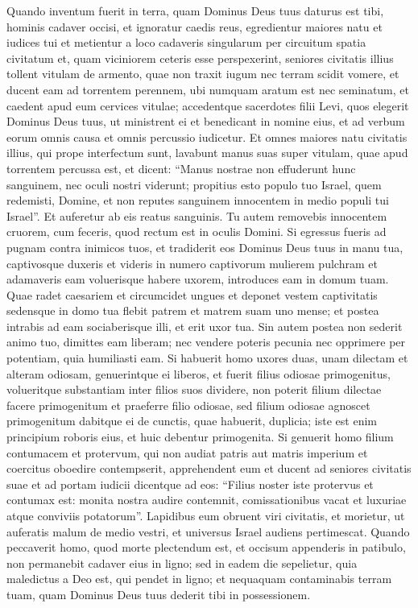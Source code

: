 \begin{biblechapter} 
\verse Quando inventum fuerit in terra, quam Dominus Deus tuus daturus est tibi, hominis cadaver occisi, et ignoratur caedis reus, 
\verse egredientur maiores natu et iudices tui et metientur a loco cadaveris singularum per circuitum spatia civitatum 
\verse et, quam viciniorem ceteris esse perspexerint, seniores civitatis illius tollent vitulam de armento, quae non traxit iugum nec terram scidit vomere, 
\verse et ducent eam ad torrentem perennem, ubi numquam aratum est nec seminatum, et caedent apud eum cervices vitulae; 
\verse accedentque sacerdotes filii Levi, quos elegerit Dominus Deus tuus, ut ministrent ei et benedicant in nomine eius, et ad verbum eorum omnis causa et omnis percussio iudicetur. 
\verse Et omnes maiores natu civitatis illius, qui prope interfectum sunt, lavabunt manus suas super vitulam, quae apud torrentem percussa est, 
\verse et dicent: “Manus nostrae non effuderunt hunc sanguinem, nec oculi nostri viderunt; 
\verse propitius esto populo tuo Israel, quem redemisti, Domine, et non reputes sanguinem innocentem in medio populi tui Israel”. Et auferetur ab eis reatus sanguinis. 
\verse Tu autem removebis innocentem cruorem, cum feceris, quod rectum est in oculis Domini. 
\verse Si egressus fueris ad pugnam contra inimicos tuos, et tradiderit eos Dominus Deus tuus in manu tua, captivosque duxeris 
\verse et videris in numero captivorum mulierem pulchram et adamaveris eam voluerisque habere uxorem, 
\verse introduces eam in domum tuam. Quae radet caesariem et circumcidet ungues 
\verse et deponet vestem captivitatis sedensque in domo tua flebit patrem et matrem suam uno mense; et postea intrabis ad eam sociaberisque illi, et erit uxor tua.  
\verse Sin autem postea non sederit animo tuo, dimittes eam liberam; nec vendere poteris pecunia nec opprimere per potentiam, quia humiliasti eam. 
\verse Si habuerit homo uxores duas, unam dilectam et alteram odiosam, genuerintque ei liberos, et fuerit filius odiosae primogenitus, 
\verse volueritque substantiam inter filios suos dividere, non poterit filium dilectae facere primogenitum et praeferre filio odiosae, 
\verse sed filium odiosae agnoscet primogenitum dabitque ei de cunctis, quae habuerit, duplicia; iste est enim principium roboris eius, et huic debentur primogenita. 
\verse Si genuerit homo filium contumacem et protervum, qui non audiat patris aut matris imperium et coercitus oboedire contempserit, 
\verse apprehendent eum et ducent ad seniores civitatis suae et ad portam iudicii 
\verse dicentque ad eos: “Filius noster iste protervus et contumax est: monita nostra audire contemnit, comissationibus vacat et luxuriae atque conviviis potatorum”. 
\verse Lapidibus eum obruent viri civitatis, et morietur, ut auferatis malum de medio vestri, et universus Israel audiens pertimescat. 
\verse Quando peccaverit homo, quod morte plectendum est, et occisum appenderis in patibulo, 
\verse non permanebit cadaver eius in ligno; sed in eadem die sepelietur, quia maledictus a Deo est, qui pendet in ligno; et nequaquam contaminabis terram tuam, quam Dominus Deus tuus dederit tibi in possessionem. 
\end{biblechapter}

